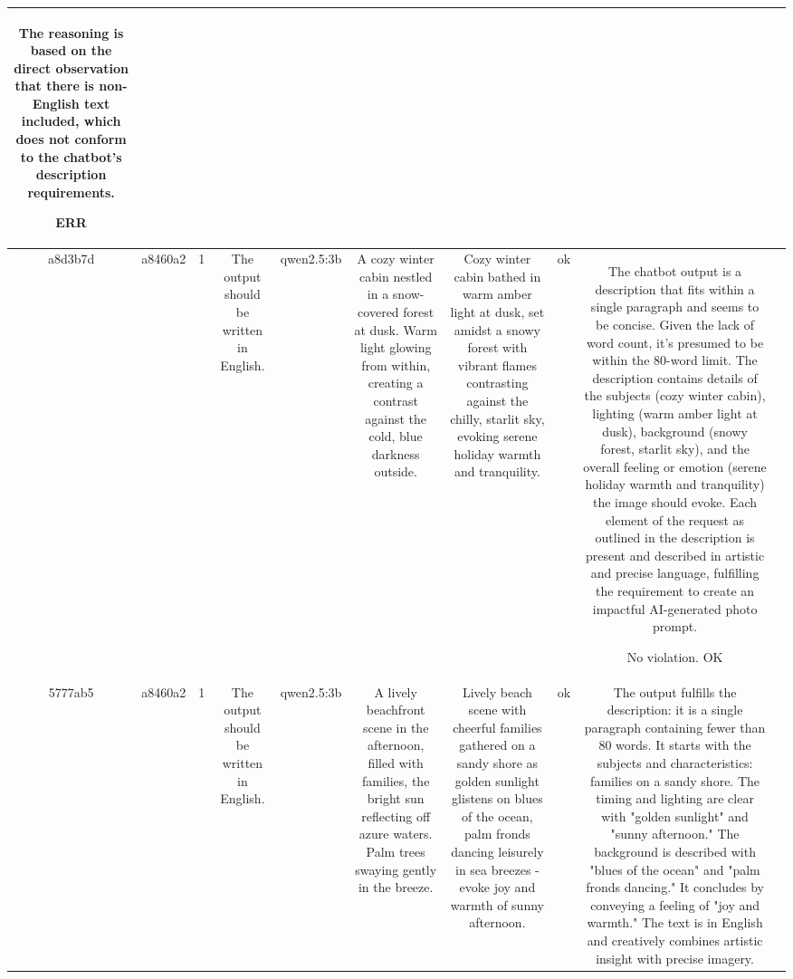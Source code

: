 \begin{table}[h!]
\begin{tabular}{|c|c|c|c|c|c|c|c|c|c|}
The reasoning is based on the direct observation that there is non-English text included, which does not conform to the chatbot's description requirements.

ERR & \\
\hline
a8d3b7d & a8460a2 & 1 & The output should be written in English. & qwen2.5:3b & A cozy winter cabin nestled in a snow-covered forest at dusk. Warm light glowing from within, creating a contrast against the cold, blue darkness outside. & Cozy winter cabin bathed in warm amber light at dusk, set amidst a snowy forest with vibrant flames contrasting against the chilly, starlit sky, evoking serene holiday warmth and tranquility. & ok & The chatbot output is a description that fits within a single paragraph and seems to be concise. Given the lack of word count, it's presumed to be within the 80-word limit. The description contains details of the subjects (cozy winter cabin), lighting (warm amber light at dusk), background (snowy forest, starlit sky), and the overall feeling or emotion (serene holiday warmth and tranquility) the image should evoke. Each element of the request as outlined in the description is present and described in artistic and precise language, fulfilling the requirement to create an impactful AI-generated photo prompt.

No violation.
OK & \\
\hline
5777ab5 & a8460a2 & 1 & The output should be written in English. & qwen2.5:3b & A lively beachfront scene in the afternoon, filled with families, the bright sun reflecting off azure waters. Palm trees swaying gently in the breeze. & Lively beach scene with cheerful families gathered on a sandy shore as golden sunlight glistens on blues of the ocean, palm fronds dancing leisurely in sea breezes - evoke joy and warmth of sunny afternoon. & ok & The output fulfills the description: it is a single paragraph containing fewer than 80 words. It starts with the subjects and characteristics: families on a sandy shore. The timing and lighting are clear with "golden sunlight" and "sunny afternoon." The background is described with "blues of the ocean" and "palm fronds dancing." It concludes by conveying a feeling of "joy and warmth." The text is in English and creatively combines artistic insight with precise imagery.


\end{tabular}
\end{table}
